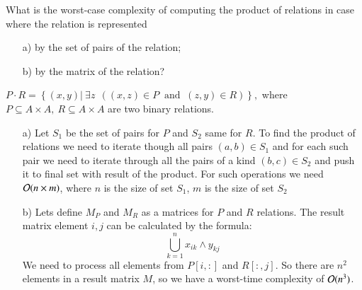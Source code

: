 \documentclass[12pt]{report}
\begin{document}
\begin{problem}{}
    What is the worst-case complexity of computing the product of relations in case where the relation is represented
    \begin{itemize}
        \item[a) ] by the set of pairs of the relation;
        \item[b) ] by the matrix of the relation?  
    \end{itemize}
\end{problem}
\begin{solution}
    \begin{definition}{}{}
        $P \cdot R = \left\{(x,y)| \ \exists z \ \ \left(\left(x, z\right) \in P \ \text{ and } \ (z,y) \in R\right)\right\},
        $ 
        where $P \subseteq A \times A, \ R \subseteq A \times A$ are two binary relations.
    \end{definition}
    \begin{itemize}
        \item[a) ] Let $S_1$ be the set of pairs for $P$ and $S_2$ same for $R$. To find the product of relations we need to iterate though all pairs $(a,b) \in S_1$ and for each such pair we need to iterate through all the pairs of a kind $(b,c) \in S_2$ and push it to final set with result of the product. For such operations we need ${\cal O}(n \times m)$, where $n$ is the size of set $S_1$, $m$ is the size of set $S_2$
        \item[b) ]  Lets define $M_P$ and $M_R$ as a matrices for $P$ and $R$ relations. The result matrix element $i, j$ can be calculated by the formula:
        \[
            \bigcup\limits_{k=1}^{n} x_{ik} \land y_{kj}            
        \]
        We need to process all elements from $P[i,:]$ and $R[:, j]$. So there are $n^2$ elements in a result matrix $M$, so we have a worst-time complexity of ${\cal O}(n^3)$. 
    \end{itemize}
\end{solution}
\end{document}

